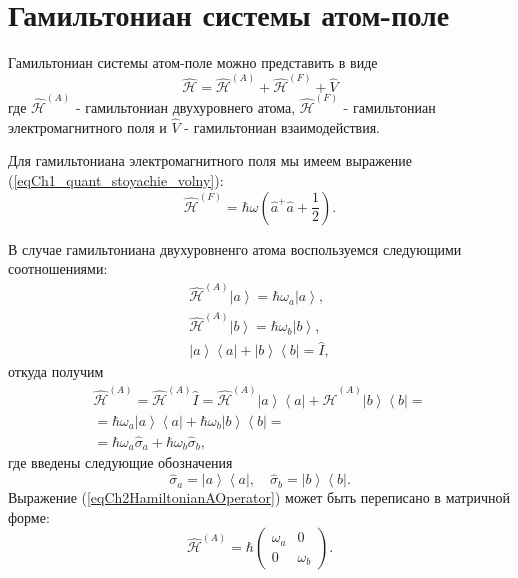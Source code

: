 \section{Гамильтониан системы атом-поле}
Гамильтониан системы атом-поле можно представить в виде
\begin{equation}
\hat{\mathcal{H}} = \hat{\mathcal{H}}^{(A)} +
\hat{\mathcal{H}}^{(F)} + \hat{V}
\nonumber
\end{equation}
где
$\hat{\mathcal{H}}^{(A)}$ - гамильтониан двухуровнего атома,
$\hat{\mathcal{H}}^{(F)}$ - гамильтониан электромагнитного поля и
$\hat{V}$ - гамильтониан взаимодействия.

Для гамильтониана электромагнитного поля мы имеем выражение
(\ref{eqCh1_quant_stoyachie_volny}):
\begin{equation}
\hat{\mathcal{H}}^{(F)} = \hbar \omega 
\left(\hat{a}^{+}\hat{a} + \frac{1}{2}\right).
\nonumber
\end{equation}

В случае гамильтониана двухуровненго атома воспользуемся следующими
соотношениями:
\begin{eqnarray}
\hat{\mathcal{H}}^{(A)}\left|a\right> = \hbar \omega_a \left|a\right>,
\nonumber \\
\hat{\mathcal{H}}^{(A)}\left|b\right> = \hbar \omega_b \left|b\right>,
\nonumber \\
\left|a\right>\left<a\right| + \left|b\right>\left<b\right| = \hat{I},
\nonumber
\end{eqnarray}
откуда получим
\begin{eqnarray}
\hat{\mathcal{H}}^{(A)} = \hat{\mathcal{H}}^{(A)}\hat{I} = 
\hat{\mathcal{H}}^{(A)}
\left|a\right>\left<a\right| + \hat{\mathcal{H}}^{(A)}
\left|b\right>\left<b\right| =
\nonumber \\
 = 
\hbar\omega_a
\left|a\right>\left<a\right| + \hbar\omega_b
\left|b\right>\left<b\right| =
\nonumber \\
= \hbar \omega_a \hat{\sigma}_a +
\hbar \omega_b \hat{\sigma}_b,
\label{eqCh2HamiltonianAOperator}
\end{eqnarray}
где введены следующие обозначения
\begin{equation}
\hat{\sigma}_a = \left|a\right>\left<a\right|,
\quad
\hat{\sigma}_b = \left|b\right>\left<b\right|.
\nonumber
\end{equation}
Выражение (\ref{eqCh2HamiltonianAOperator}) может быть переписано в
матричной форме:
\begin{equation}
\hat{\mathcal{H}}^{(A)} = \hbar 
\left(
\begin{array} {cc}
\omega_a & 0  
\\
0 & \omega_b 
\end{array}
\right).
\label{eqCh2HamiltonianA}
\end{equation}

